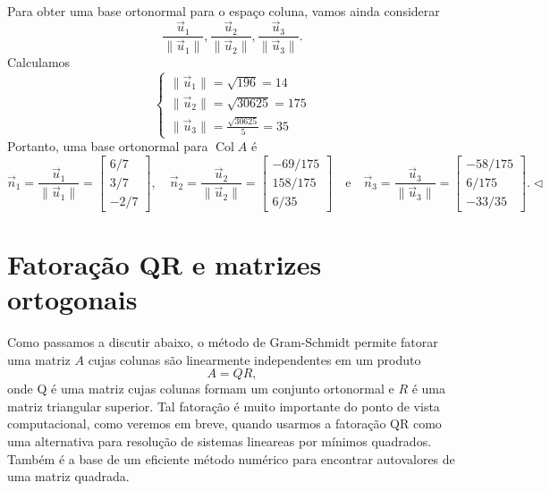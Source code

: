 \documentclass[../livro.tex]{subfiles}  %
\begin{document}
\begin{example}
\begin{align*}
  \end{align*}
  Para obter uma base ortonormal para o espaço coluna, vamos ainda considerar
\begin{equation}
\frac{\vec{u}_1}{\|\vec{u}_1\|}, \frac{\vec{u}_2}{\|\vec{u}_2\|}, \frac{\vec{u}_3}{\|\vec{u}_3\|}.
\end{equation} Calculamos
\begin{equation}
\left\{
  \begin{array}{ll}
   \|\vec{u}_1\| = \sqrt{196} = 14 \\
   \|\vec{u}_2\| = \sqrt{30625} = 175 \\
   \|\vec{u}_3\| = \frac{\sqrt{30625}}{5} = 35
  \end{array}
\right.
\end{equation} Portanto, uma base ortonormal para $\operatorname{Col} A$ é
\begin{equation}
\vec{n}_1 = \frac{\vec{u}_1}{\|\vec{u}_1\|} =
\begin{bmatrix}
 6/7  \\
 3/7  \\
 -2/7
\end{bmatrix}, \quad
\vec{n}_2 = \frac{\vec{u}_2}{\|\vec{u}_2\|} =
\begin{bmatrix}
 -69/175  \\
 158/175  \\
 6/35
\end{bmatrix} \quad \text{e} \quad
\vec{n}_3 = \frac{\vec{u}_3}{\|\vec{u}_3\|} =
\begin{bmatrix}
 -58/175  \\
 6/175  \\
 -33/35
\end{bmatrix}. \lhd
\end{equation}
\end{example}


\section{Fatoração QR e matrizes ortogonais}


Como passamos a discutir abaixo, o método de Gram-Schmidt permite fatorar uma matriz $A$ cujas colunas são linearmente independentes em um produto \begin{equation}A=QR,\end{equation} onde Q é uma matriz cujas colunas formam um conjunto ortonormal e $R$ é uma matriz triangular superior. Tal fatoração é muito importante do ponto de vista computacional, como veremos em breve, quando usarmos a fatoração QR como uma alternativa para resolução de sistemas lineareas por mínimos quadrados. Também é a base de um eficiente método numérico para encontrar autovalores de uma matriz quadrada.
\end{document}
